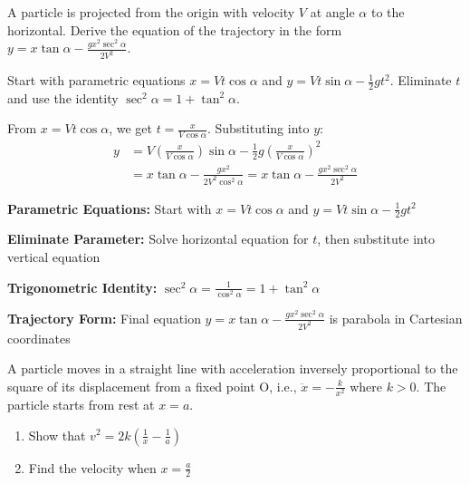 \begin{problem}
A particle is projected from the origin with velocity $V$ at angle $\alpha$ to the horizontal. Derive the equation of the trajectory in the form $y = x\tan\alpha - \frac{gx^2\sec^2\alpha}{2V^2}$.
\end{problem}

\begin{hint}
Start with parametric equations $x = Vt\cos\alpha$ and $y = Vt\sin\alpha - \frac{1}{2}gt^2$. Eliminate $t$ and use the identity $\sec^2\alpha = 1 + \tan^2\alpha$.
\end{hint}

\begin{solution}
From $x = Vt\cos\alpha$, we get $t = \frac{x}{V\cos\alpha}$. Substituting into $y$:
\begin{align*}
y &= V\left(\frac{x}{V\cos\alpha}\right)\sin\alpha - \frac{1}{2}g\left(\frac{x}{V\cos\alpha}\right)^2 \\
&= x\tan\alpha - \frac{gx^2}{2V^2\cos^2\alpha} = x\tan\alpha - \frac{gx^2\sec^2\alpha}{2V^2}
\end{align*}
\end{solution}

\begin{takeaways}
\item \textbf{Parametric Equations:} Start with $x = Vt\cos\alpha$ and $y = Vt\sin\alpha - \frac{1}{2}gt^2$
\item \textbf{Eliminate Parameter:} Solve horizontal equation for $t$, then substitute into vertical equation
\item \textbf{Trigonometric Identity:} $\sec^2\alpha = \frac{1}{\cos^2\alpha} = 1 + \tan^2\alpha$
\item \textbf{Trajectory Form:} Final equation $y = x\tan\alpha - \frac{gx^2\sec^2\alpha}{2V^2}$ is parabola in Cartesian coordinates
\end{takeaways}

\begin{problem}
A particle moves in a straight line with acceleration inversely proportional to the square of its displacement from a fixed point O, i.e., $\ddot{x} = -\frac{k}{x^2}$ where $k > 0$. The particle starts from rest at $x = a$.

\begin{enumerate}[label=\textbf{\roman*.}]
    \item Show that $v^2 = 2k\left(\frac{1}{x} - \frac{1}{a}\right)$
    \item Find the velocity when $x = \frac{a}{2}$
\end{enumerate}
\end{problem}

